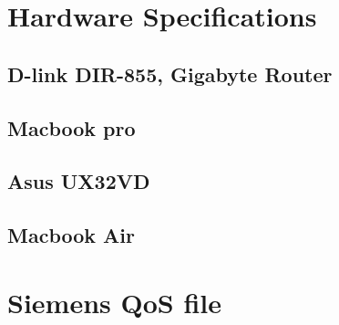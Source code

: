 
\chapter{Hardware Specifications}\label{appendix:HardwareSpecification}


\section{D-link DIR-855, Gigabyte Router}



\section{Macbook pro}\label{appendix:hardwareSpecification_pro}

\section{Asus UX32VD}\label{appendix:hardwareSpecification_asus}

\section{Macbook Air}\label{appendix:hardwareSpecification_air}


\chapter{Siemens QoS file}\label{appendix:siemensQosFile}
